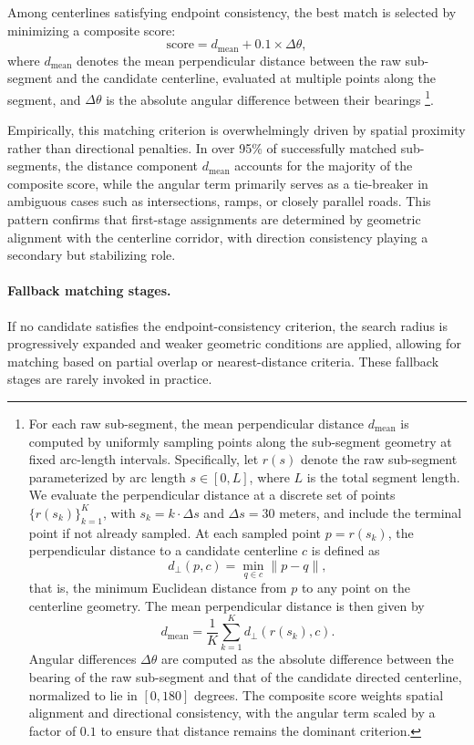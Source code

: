 \documentclass[12pt]{article}
\begin{document}
	Among centerlines satisfying endpoint consistency, the best match is selected by minimizing a composite score:
	\[\text{score} = d_{\text{mean}} + 0.1 \times \Delta \theta,\]
	where $d_{\text{mean}}$ denotes the mean perpendicular distance between the raw sub-segment and the candidate centerline, evaluated at multiple points along the segment, and $\Delta \theta$ is the absolute angular difference between their bearings
	\footnote{
		For each raw sub-segment, the mean perpendicular distance $d_{\text{mean}}$ is computed by uniformly sampling points along the sub-segment geometry at fixed arc-length intervals. Specifically, let $r(s)$ denote the raw sub-segment parameterized by arc length $s \in [0, L]$, where $L$ is the total segment length. We evaluate the perpendicular distance at a discrete set of points $\{ r(s_k) \}_{k=1}^{K}$, with $s_k = k \cdot \Delta s$ and $\Delta s = 30$ meters, and include the terminal point if not already sampled. At each sampled point $p = r(s_k)$, the perpendicular distance to a candidate centerline $c$ is defined as
		\[d_\perp(p, c) = \min_{q \in c} \| p - q \|,\]
		that is, the minimum Euclidean distance from $p$ to any point on the centerline geometry.
		The mean perpendicular distance is then given by
		\[d_{\text{mean}} = \frac{1}{K} \sum_{k=1}^{K} d_\perp(r(s_k), c).\]
		Angular differences $\Delta \theta$ are computed as the absolute difference between the bearing of the raw sub-segment and that of the candidate directed centerline, normalized to lie in $[0,180]$ degrees.
		The composite score weights spatial alignment and directional consistency, with the angular term scaled by a factor of $0.1$ to ensure that distance remains the dominant criterion.
	}.

	
	Empirically, this matching criterion is overwhelmingly driven by spatial proximity rather than directional penalties. In over 95\% of successfully matched sub-segments, the distance component $d_{\text{mean}}$ accounts for the majority of the composite score, while the angular term primarily serves as a tie-breaker in ambiguous cases such as intersections, ramps, or closely parallel roads. This pattern confirms that first-stage assignments are determined by geometric alignment with the centerline corridor, with direction consistency playing a secondary but stabilizing role.
	
	\paragraph{Fallback matching stages.}
	If no candidate satisfies the endpoint-consistency criterion, the search radius is progressively expanded and weaker geometric conditions are applied, allowing for matching based on partial overlap or nearest-distance criteria. These fallback stages are rarely invoked in practice.
	
\end{document}
